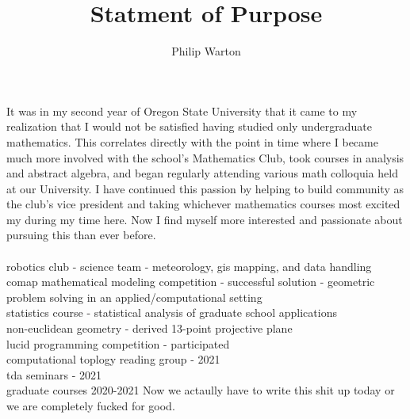 \documentclass{article}
\theoremstyle{definition}
\begin{document}
\title{Statment of Purpose}
\author{Philip Warton}
\maketitle
It was in my second year of Oregon State University that it came to my realization that I would not
be satisfied having studied only undergraduate mathematics. This correlates directly with the point in 
time where I became much more involved with the school's Mathematics Club, took courses in analysis and 
abstract algebra, and began regularly attending various math colloquia held at our University. I have 
continued this passion by helping to build community as the club's vice president and taking whichever 
mathematics courses most excited my during my time here. Now I find myself more interested and passionate about pursuing this than ever before. \\\\

robotics club - science team - meteorology, gis mapping, and data handling\\
comap mathematical modeling competition - successful solution - geometric problem solving in an applied/computational setting\\
statistics course - statistical analysis of graduate school applications\\
non-euclidean geometry - derived 13-point projective plane \\
lucid programming competition - participated\\
computational toplogy reading group - 2021\\
tda seminars - 2021\\
graduate courses 2020-2021
Now we actaully have to write this shit up today or we are completely fucked for good.
\end{document}
